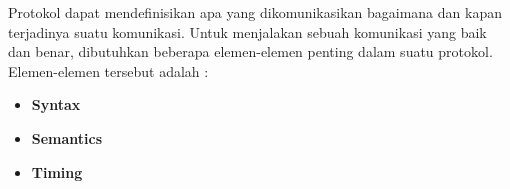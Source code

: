 Protokol dapat mendefinisikan apa yang dikomunikasikan bagaimana dan kapan terjadinya suatu komunikasi. Untuk menjalakan sebuah komunikasi yang baik dan benar, dibutuhkan beberapa elemen-elemen penting dalam suatu protokol. Elemen-elemen tersebut adalah :
\begin{itemize}
\item \textbf{Syntax} 
\item \textbf{Semantics} 
\item \textbf{Timing} 
\end{itemize}

 
